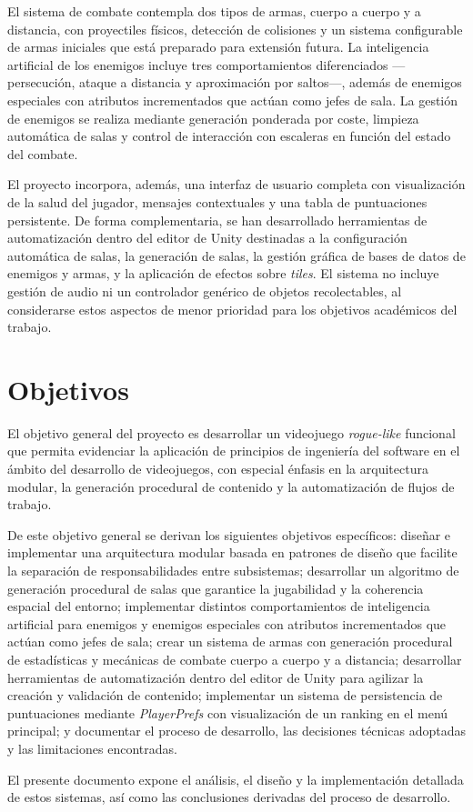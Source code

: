 El sistema de combate contempla dos tipos de armas, cuerpo a cuerpo y a distancia, con proyectiles físicos, detección de colisiones y un sistema configurable de armas iniciales que está preparado para extensión futura. La inteligencia artificial de los enemigos incluye tres comportamientos diferenciados —persecución, ataque a distancia y aproximación por saltos—, además de enemigos especiales con atributos incrementados que actúan como jefes de sala. La gestión de enemigos se realiza mediante generación ponderada por coste, limpieza automática de salas y control de interacción con escaleras en función del estado del combate.

El proyecto incorpora, además, una interfaz de usuario completa con visualización de la salud del jugador, mensajes contextuales y una tabla de puntuaciones persistente. De forma complementaria, se han desarrollado herramientas de automatización dentro del editor de Unity destinadas a la configuración automática de salas, la generación de salas, la gestión gráfica de bases de datos de enemigos y armas, y la aplicación de efectos sobre \textit{tiles}. El sistema no incluye gestión de audio ni un controlador genérico de objetos recolectables, al considerarse estos aspectos de menor prioridad para los objetivos académicos del trabajo.

\section{Objetivos}

El objetivo general del proyecto es desarrollar un videojuego \textit{rogue-like} funcional que permita evidenciar la aplicación de principios de ingeniería del software en el ámbito del desarrollo de videojuegos, con especial énfasis en la arquitectura modular, la generación procedural de contenido y la automatización de flujos de trabajo.

De este objetivo general se derivan los siguientes objetivos específicos: diseñar e implementar una arquitectura modular basada en patrones de diseño que facilite la separación de responsabilidades entre subsistemas; desarrollar un algoritmo de generación procedural de salas que garantice la jugabilidad y la coherencia espacial del entorno; implementar distintos comportamientos de inteligencia artificial para enemigos y enemigos especiales con atributos incrementados que actúan como jefes de sala; crear un sistema de armas con generación procedural de estadísticas y mecánicas de combate cuerpo a cuerpo y a distancia; desarrollar herramientas de automatización dentro del editor de Unity para agilizar la creación y validación de contenido; implementar un sistema de persistencia de puntuaciones mediante \textit{PlayerPrefs} con visualización de un ranking en el menú principal; y documentar el proceso de desarrollo, las decisiones técnicas adoptadas y las limitaciones encontradas.

El presente documento expone el análisis, el diseño y la implementación detallada de estos sistemas, así como las conclusiones derivadas del proceso de desarrollo.
